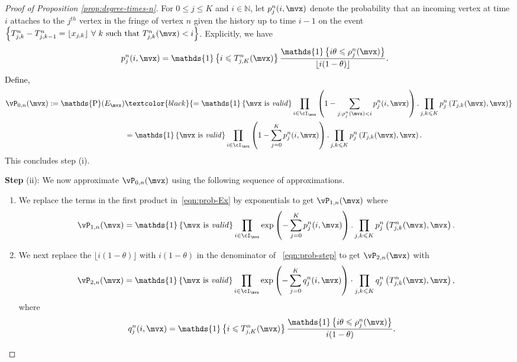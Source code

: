 \documentclass[letterpaper,11pt,reqno]{amsart}
\theoremstyle{definition}
\renewcommand{\leq}{\leqslant}
\newcommand{\ind}{\mathds{1}}
\newcommand{\set}[1]{\left\{#1\right\}}
\DeclareMathOperator{\pr}{\mathds{P}}
\begin{document}
\begin{proof}[Proof of Proposition \ref{prop:degree-times-n}]
For $0\leq j\leq K$ and $i \in \mathbb{N}$, { let $p^n_j(i,\mvx)$ denote the probability that an incoming vertex at time $i$ attaches to the $j^{th}$ vertex in the fringe of vertex $n$ given the history up to time $i-1$ on the event $\set{T^n_{j,k}-T^n_{j,k-1} = \lfloor x_{j,k}\rfloor \  \forall \ k \text{ such that } T_{j,k}^n(\mvx) < i}$. Explicitly, we have  }
\begin{align}\label{eqn:prob-step}
    p^n_j(i,\mvx) &= \ind\set{i\leq T_{j,K}^n(\mvx)}
        \frac{\ind\set{i\theta \leq \rho_{j}^n(\mvx)}}{\lfloor i(1-\theta)\rfloor}.
\end{align} 
\textcolor{black}{Define,} %
\begin{align}
\label{eqn:prob-Ex}
    \vP_{0,n}(\mvx) := \pr(E_{\mvx}) &\textcolor{black}{= \ind\set{\mvx \text{ is \emph{valid}}} \prod_{i\in \cI_{\mvx}} \left(1-\sum\limits_{j :\rho^n_j(\mvx) <i} p_j^n(i,\mvx)\right) . \prod\limits_{j,k\leq K}p_{j}^n\left(T_{j,k}(\mvx),\mvx\right)}\notag\\
    &= \ind\set{\mvx \text{ is \emph{valid}}} \prod_{i\in \cI_{\mvx}} \left(1-\sum\limits_{j=0}^K p_j^n(i,\mvx)\right) . \prod\limits_{j,k\leq K}p_{j}^n\left(T_{j,k}(\mvx),\mvx\right).
\end{align} This concludes step (i). 



\vspace{0.5cm}

\noindent \textbf{Step} (ii): We now approximate $\vP_{0,n}(\mvx)$ using the following sequence of approximations. \begin{enumerate}
    \item We replace the terms in the first product in~\eqref{eqn:prob-Ex} by exponentials to get $\vP_{1,n}(\mvx)$ where \begin{align}\label{eqn:prob-ex-1}
    \vP_{1,n}(\mvx) = \ind\set{\mvx \text{ is \emph{valid}}} \prod\limits_{i\in \cI_{\mvx}} \exp\left(-\sum\limits_{j=0}^K p_j^n(i,\mvx)\right)  . \prod\limits_{j,k\leq K}p_{j}^n\left(T_{j,k}^n(\mvx),\mvx\right).
\end{align}
\item We next replace the $\lfloor i(1-\theta)\rfloor$ with $i(1-\theta)$ in the denominator of ~\eqref{eqn:prob-step} to get $\vP_{2,n}(\mvx)$ with \begin{align}\label{eqn:prob-ex-2}
\vP_{2,n}(\mvx) = \ind\set{\mvx \text{ is \emph{valid}}} \prod\limits_{i\in \cI_{\mvx}} \exp\left(-\sum\limits_{j=0}^K q_j^n(i,\mvx)\right)  \cdot \prod\limits_{j,k\leq K}q_{j}^n\left(T_{j,k}^n(\mvx),\mvx\right),
\end{align} 
where 
\begin{align}\label{eqn:q_j-defn}
    q^n_j(i,\mvx) &= \ind\set{i\leq T_{j,K}^n(\mvx)}\frac{\ind\set{i\theta \leq \rho_{j}^n(\mvx)}}{i(1-\theta)}.
\end{align}


\end{enumerate}
\end{proof}
\end{document}

